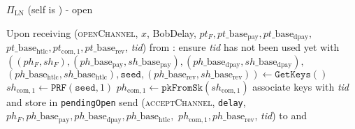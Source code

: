 \begin{protocolbox}{$\Pi_{\mathrm{LN}}$ (self is \alice) - open}
  \label{alg:protocol:open}
  \begin{algorithmic}[1]
    \State Upon receiving (\textsc{openChannel}, $x$, BobDelay, $pt_F,
    pt\_\mathrm{base}_{\mathrm{pay}}, pt\_\mathrm{base}_{\mathrm{dpay}},$
    $pt\_\mathrm{base}_{\mathrm{htlc}}, pt_{\mathrm{com}, 1},
    pt\_\mathrm{base}_{\mathrm{rev}}$, \textit{tid}) from \bob:
    \Indent
      \State ensure \textit{tid} has not been used yet with \bob
      \State $\left(\left(ph_F, sh_F\right),
      \left(ph\_\mathrm{base}_{\mathrm{pay}},
      sh\_\mathrm{base}_{\mathrm{pay}}\right),
      \left(ph\_\mathrm{base}_{\mathrm{dpay}},
      sh\_\mathrm{base}_{\mathrm{dpay}}\right),\right.$
      $\left.\left(ph\_\mathrm{base}_{\mathrm{htlc}},
      sh\_\mathrm{base}_{\mathrm{htlc}}\right), \mathtt{seed},
      \left(ph\_\mathrm{base}_{\mathrm{rev}},
      sh\_\mathrm{base}_{\mathrm{rev}}\right)\right) \gets
      \texttt{GetKeys}\left(\right)$
      \State $sh_{\mathrm{com}, 1} \gets
      \texttt{PRF}\left(\mathtt{seed}, 1\right)$
      \State $ph_{\mathrm{com}, 1} \gets
      \mathtt{pkFromSk}\left(sh_{\mathrm{com}, 1}\right)$
      \State associate keys with \textit{tid} and store in \texttt{pendingOpen}
      \State send (\textsc{acceptChannel}, \texttt{delay}, $ph_F,
      ph\_\mathrm{base}_{\mathrm{pay}}, ph\_\mathrm{base}_{\mathrm{dpay}},
      ph\_\mathrm{base}_{\mathrm{htlc}},$ $ph_{\mathrm{com}, 1},
      ph\_\mathrm{base}_{\mathrm{rev}}$, \textit{tid}) to \bob{} and \adversary
    \EndIndent
    \State


\end{algorithmic}
\end{protocolbox}
